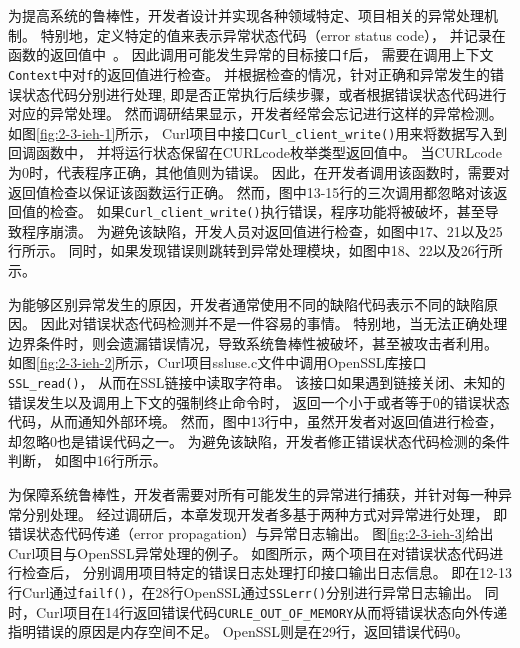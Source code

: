 



为提高系统的鲁棒性，开发者设计并实现各种领域特定、项目相关的异常处理机制。
特别地，定义特定的值来表示异常状态代码（error status code），
并记录在函数的返回值中~\cite{08-fast-eio}。
因此调用可能发生异常的目标接口\texttt{f}后，
需要在调用上下文\texttt{Context}中对\texttt{f}的返回值进行检查。
并根据检查的情况，针对正确和异常发生的错误状态代码分别进行处理,
即是否正常执行后续步骤，或者根据错误状态代码进行对应的异常处理。
然而调研结果显示，开发者经常会忘记进行这样的异常检测。
如图\ref{fig:2-3-ieh-1}所示，
Curl项目中接口\texttt{Curl\_client\_write()}用来将数据写入到回调函数中，
并将运行状态保留在CURLcode枚举类型返回值中。
当CURLcode为0时，代表程序正确，其他值则为错误。
因此，在开发者调用该函数时，需要对返回值检查以保证该函数运行正确。
然而，图中13-15行的三次调用都忽略对该返回值的检查。
如果\texttt{Curl\_client\_write()}执行错误，程序功能将被破坏，甚至导致程序崩溃。
为避免该缺陷，开发人员对返回值进行检查，如图中17、21以及25行所示。
同时，如果发现错误则跳转到异常处理模块，如图中18、22以及26行所示。


为能够区别异常发生的原因，开发者通常使用不同的缺陷代码表示不同的缺陷原因。
因此对错误状态代码检测并不是一件容易的事情。
特别地，当无法正确处理边界条件时，则会遗漏错误情况，导致系统鲁棒性被破坏，甚至被攻击者利用。
如图\ref{fig:2-3-ieh-2}所示，Curl项目ssluse.c文件中调用OpenSSL库接口\texttt{SSL\_read()}，
从而在SSL链接中读取字符串。
该接口如果遇到链接关闭、未知的错误发生以及调用上下文的强制终止命令时，
返回一个小于或者等于0的错误状态代码，从而通知外部环境。
然而，图中13行中，虽然开发者对返回值进行检查，却忽略0也是错误代码之一。
为避免该缺陷，开发者修正错误状态代码检测的条件判断，
如图中16行所示。



为保障系统鲁棒性，开发者需要对所有可能发生的异常进行捕获，并针对每一种异常分别处理。
经过调研后，本章发现开发者多基于两种方式对异常进行处理，
即错误状态代码传递（error propagation）与异常日志输出。
图\ref{fig:2-3-ieh-3}给出Curl项目与OpenSSL异常处理的例子。
如图所示，两个项目在对错误状态代码进行检查后，
分别调用项目特定的错误日志处理打印接口输出日志信息。
即在12-13行Curl通过\texttt{failf()}，在28行OpenSSL通过\texttt{SSLerr()}分别进行异常日志输出。
同时，Curl项目在14行返回错误代码\texttt{CURLE\_OUT\_OF\_MEMORY}从而将错误状态向外传递指明错误的原因是内存空间不足。
OpenSSL则是在29行，返回错误代码0。

\vspace*{10pt}
\begin{center}
	\noindent{}
\end{center}


